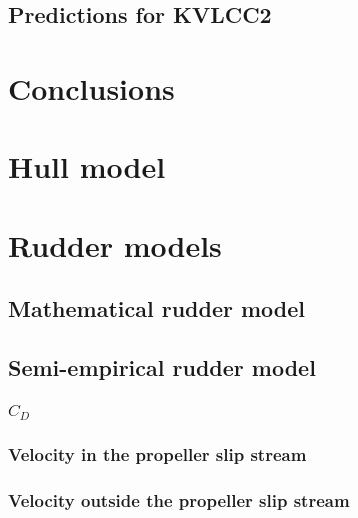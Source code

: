 \documentclass[preprint,12pt,authoryear]{elsarticle}
\begin{document}
\subsection{Predictions for KVLCC2}
\label{sec:result_KVLCC2_HMRI}

\FloatBarrier
%


%
\section{Conclusions}
\label{sec:conclusions}

\FloatBarrier

\appendix
\section{Hull model}
\label{sec:hull}

%
\section{Rudder models}
\label{sec:rudder_models}
\subsection{Mathematical rudder model}
\label{sec:mathematical_rudder_model}

\subsection{Semi-empirical rudder model}
\label{sec:semi-empirical_rudder_model}
%
\subsubsection{$C_D$}
\label{sec:CD}

\subsubsection{Velocity in the propeller slip stream}
\label{sec:velocity_in_the_propeller_slip_stream}

\subsubsection{Velocity outside the propeller slip stream}
\label{sec:velocity_outside_the_propeller_slip_stream}


\FloatBarrier
\pagebreak


\end{document}

